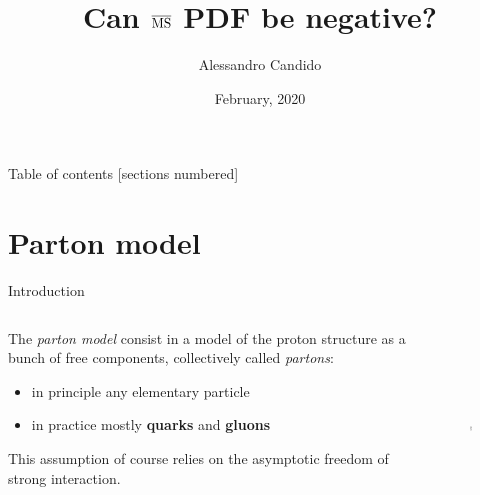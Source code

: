 \documentclass[9pt]{beamer}
\title{Can $\operatorname{\overline{MS}}$ PDF be negative?}
\date{February, 2020}
\author{Alessandro Candido
}
\begin{document}
\maketitle

\begin{frame}{Table of contents}
  [sections numbered]
    \tableofcontents%
\end{frame}

\section{Parton model}
\begin{frame}{Introduction}
    \begin{columns}
        \begin{column}{0.7\textwidth}
            The \textit{parton model} consist in a model of the proton
            structure as a bunch of free components, collectively called
            \textit{partons}:

            \begin{itemize}
                \item in principle any elementary particle
                \item in practice mostly \textbf{quarks} and \textbf{gluons}
            \end{itemize}

            This assumption of course relies on the asymptotic freedom of
            strong interaction\footnotemark.
        \end{column}
        \begin{column}{0.3\textwidth}
            \begin{figure}
                \centering
                \includegraphics[height=150pt]{pictures/partons}
            \end{figure}
        \end{column}
    \end{columns}

\end{frame}
\end{document}

